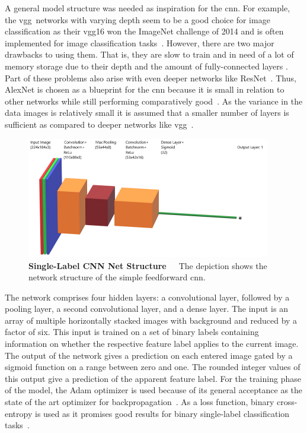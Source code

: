 A general model structure was needed as inspiration for the \acrshort{cnn}. For example, the \acrfull{vgg}~networks with varying depth seem to be a good choice for image classification as their \acrshort{vgg}16 won the ImageNet challenge of 2014 and is often implemented for image classification tasks~\citep{hassan2018vgg,vgg2014original}. However, there are two major drawbacks to using them. That is, they are slow to train and in need of a lot of memory storage due to their depth and the amount of fully-connected layers \citep{hassan2018vgg,zhang2015accelerating}. Part of these problems also arise with even deeper networks like ResNet~\citep{resnet2016original,hassan2019resnet}. Thus, AlexNet is chosen as a blueprint for the \acrshort{cnn} because it is small in relation to other networks while still performing comparatively good~\citep{hassan2019alexnet,alexnet2012original,geron2019hands}. As the variance in the data images is relatively small it is assumed that a smaller number of layers is sufficient as compared to deeper networks like \acrshort{vgg}~\citep{geron2019hands}.

\begin{figure}[!htb]
	\centering
	\includegraphics[width=0.95\textwidth]{Figures/chapter04/singleCNN_net_structure.png}
	\caption[Single-Label CNN Net Structure]{\textbf{Single-Label CNN Net Structure}~~~The depiction shows the network structure of the simple feedforward \acrshort{cnn}.}
	\label{fig:SingleLabelNetStructure}
\end{figure}
 
\bigskip
The network comprises four hidden layers: a convolutional layer, followed by a pooling layer, a second convolutional layer, and a dense layer. The input is an array of multiple horizontally stacked images with background and reduced by a factor of six. This input is trained on a set of binary labels containing information on whether the respective feature label applies to the current image. The output of the network gives a prediction on each entered image gated by a sigmoid function on a range between zero and one. The rounded integer values of this output give a prediction of the apparent feature label.
For the training phase of the model, the Adam optimizer is used because of its general acceptance as the state of the art optimizer for backpropagation~\citep{bushaev2018adam,kingma2014adam}. As a loss function, binary cross-entropy is used as it promises good results for binary single-label classification tasks~\citep{geron2019hands,godoy2018understanding,dertat2017applied}.
 
